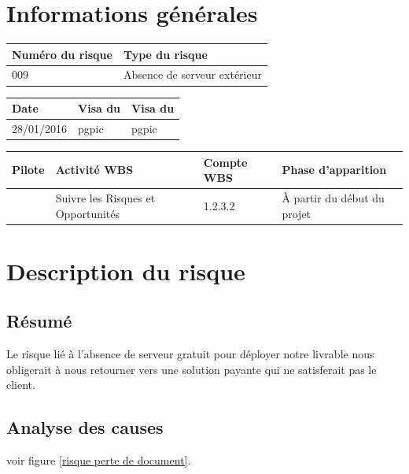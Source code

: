 \section*{Informations générales}
 
\begin{table}[H]
\centering
	\begin{tabularx}{16.8cm}{|X|X|}
	\hline
	\rowcolor{gray!40} Numéro du risque & Type du risque \\
	\hline
	009 & Absence de serveur extérieur \\
	\hline
	\end{tabularx}
\end{table}

\begin{table}[H]
\centering
	\begin{tabularx}{16.8cm}{|X|X|X|}
	\hline
	\rowcolor{gray!40} Date & Visa du \RQ & Visa du \CP \\
	\hline
	 28/01/2016 & pgpic & pgpic \\
	\hline
	\end{tabularx}
\end{table}

\begin{table}[H]
\centering
	\begin{tabularx}{16.8cm}{|X|X|X|X|}
	\hline
	\rowcolor{gray!40} Pilote & Activité WBS & Compte WBS & Phase d'apparition \\
	\hline
	 \Mathieu & Suivre les Risques et Opportunités & 1.2.3.2 & À partir du début du projet\\
	\hline
	\end{tabularx}
\end{table}

\section*{Description du risque}

\subsection*{Résumé}
	Le risque lié à l'absence de serveur gratuit pour déployer notre livrable nous obligerait à nous retourner vers une solution payante qui ne satisferait pas le client.
	
\subsection*{Analyse des causes}
	voir figure \ref{risque perte de document}.


